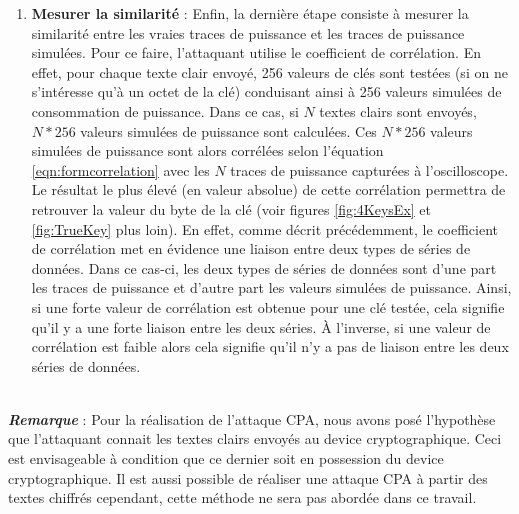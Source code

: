 \documentclass[oneside]{book}
\begin{document}
\begin{enumerate}
\item \textbf{Mesurer la similarité} : Enfin, la dernière étape consiste à mesurer la similarité entre les vraies traces de puissance et les traces de puissance simulées. Pour ce faire, l'attaquant utilise le coefficient de corrélation. En effet, pour chaque texte clair envoyé, 256 valeurs de clés sont testées (si on ne s'intéresse qu'à un octet de la clé) conduisant ainsi à 256 valeurs simulées de consommation de puissance. Dans ce cas, si $N$ textes clairs sont envoyés, $N*256$ valeurs simulées de puissance sont calculées. Ces $N*256$ valeurs simulées de puissance sont alors corrélées selon l'équation \ref{eqn:formcorrelation} avec les $N$ traces de puissance capturées à l'oscilloscope. Le résultat le plus élevé (en valeur absolue) de cette corrélation permettra de retrouver la valeur du byte de la clé (voir figures \ref{fig:4KeysEx} et \ref{fig:TrueKey} plus loin). En effet, comme décrit précédemment, le coefficient de corrélation met en évidence une liaison entre deux types de séries de données. Dans ce cas-ci, les deux types de séries de données sont d'une part les traces de puissance et d'autre part les valeurs simulées de puissance. Ainsi, si une forte valeur de corrélation est obtenue pour une clé testée, cela signifie qu'il y a une forte liaison entre les deux séries. À l'inverse, si une valeur de corrélation est faible alors cela signifie qu'il n'y a pas de liaison entre les deux séries de données. \\ \\
\end{enumerate}

\hspace{-0.5 cm}\textbf{\textit{Remarque}} : Pour la réalisation de l'attaque CPA, nous avons posé l'hypothèse que l'attaquant connait les textes clairs envoyés au device cryptographique. Ceci est envisageable à condition que ce dernier soit en possession du device cryptographique. Il est aussi possible de réaliser une attaque CPA à partir des textes chiffrés cependant, cette méthode ne sera pas abordée dans ce travail.

\newpage
\end{document}
